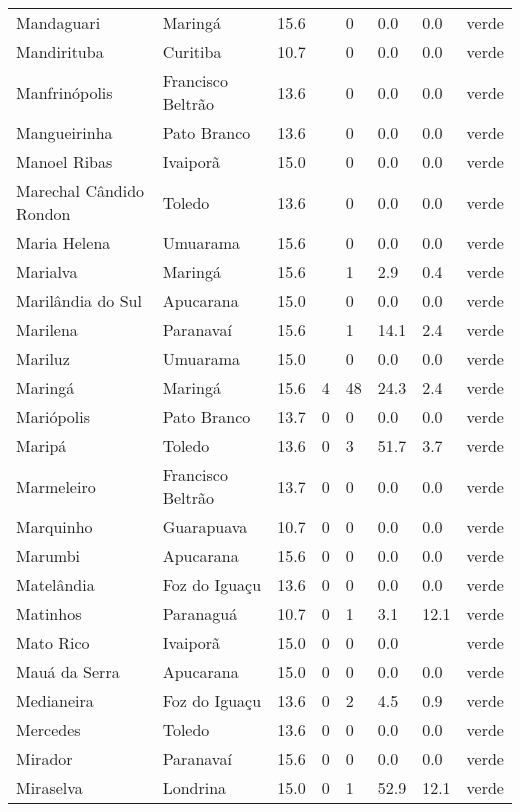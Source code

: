 \begin{longtable}{l|lllllll}
  Mandaguari & Maringá & 15.6 &  & 0 & 0.0 & 0.0 & verde \\ 
  Mandirituba & Curitiba & 10.7 &  & 0 & 0.0 & 0.0 & verde \\ 
  Manfrinópolis & Francisco Beltrão & 13.6 &  & 0 & 0.0 & 0.0 & verde \\ 
  Mangueirinha & Pato Branco & 13.6 &  & 0 & 0.0 & 0.0 & verde \\ 
  Manoel Ribas & Ivaiporã & 15.0 &  & 0 & 0.0 & 0.0 & verde \\ 
  Marechal Cândido Rondon & Toledo & 13.6 &  & 0 & 0.0 & 0.0 & verde \\ 
  Maria Helena & Umuarama & 15.6 &  & 0 & 0.0 & 0.0 & verde \\ 
  Marialva & Maringá & 15.6 &  & 1 & 2.9 & 0.4 & verde \\ 
  Marilândia do Sul & Apucarana & 15.0 &  & 0 & 0.0 & 0.0 & verde \\ 
  Marilena & Paranavaí & 15.6 &  & 1 & 14.1 & 2.4 & verde \\ 
  Mariluz & Umuarama & 15.0 &  & 0 & 0.0 & 0.0 & verde \\ 
  Maringá & Maringá & 15.6 & 4 & 48 & 24.3 & 2.4 & verde \\ 
  Mariópolis & Pato Branco & 13.7 & 0 & 0 & 0.0 & 0.0 & verde \\ 
  Maripá & Toledo & 13.6 & 0 & 3 & 51.7 & 3.7 & verde \\ 
  Marmeleiro & Francisco Beltrão & 13.7 & 0 & 0 & 0.0 & 0.0 & verde \\ 
  Marquinho & Guarapuava & 10.7 & 0 & 0 & 0.0 & 0.0 & verde \\ 
  Marumbi & Apucarana & 15.6 & 0 & 0 & 0.0 & 0.0 & verde \\ 
  Matelândia & Foz do Iguaçu & 13.6 & 0 & 0 & 0.0 & 0.0 & verde \\ 
  Matinhos & Paranaguá & 10.7 & 0 & 1 & 3.1 & 12.1 & verde \\ 
  Mato Rico & Ivaiporã & 15.0 & 0 & 0 & 0.0 &  & verde \\ 
  Mauá da Serra & Apucarana & 15.0 & 0 & 0 & 0.0 & 0.0 & verde \\ 
  Medianeira & Foz do Iguaçu & 13.6 & 0 & 2 & 4.5 & 0.9 & verde \\ 
  Mercedes & Toledo & 13.6 & 0 & 0 & 0.0 & 0.0 & verde \\ 
  Mirador & Paranavaí & 15.6 & 0 & 0 & 0.0 & 0.0 & verde \\ 
  Miraselva & Londrina & 15.0 & 0 & 1 & 52.9 & 12.1 & verde \\ 

\end{longtable}
